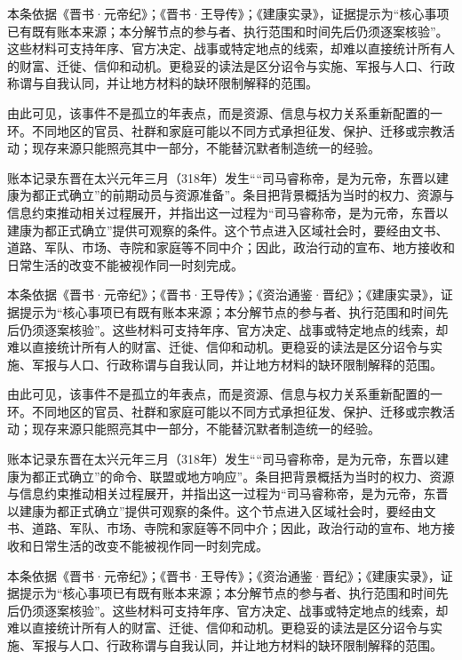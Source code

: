 本条依据《晋书·元帝纪》；《晋书·王导传》；《建康实录》，证据提示为“核心事项已有既有账本来源；本分解节点的参与者、执行范围和时间先后仍须逐案核验”。这些材料可支持年序、官方决定、战事或特定地点的线索，却难以直接统计所有人的财富、迁徙、信仰和动机。更稳妥的读法是区分诏令与实施、军报与人口、行政称谓与自我认同，并让地方材料的缺环限制解释的范围。

由此可见，该事件不是孤立的年表点，而是资源、信息与权力关系重新配置的一环。不同地区的官员、社群和家庭可能以不同方式承担征发、保护、迁移或宗教活动；现存来源只能照亮其中一部分，不能替沉默者制造统一的经验。

账本记录东晋在太兴元年三月（318年）发生““司马睿称帝，是为元帝，东晋以建康为都正式确立”的前期动员与资源准备”。条目把背景概括为当时的权力、资源与信息约束推动相关过程展开，并指出这一过程为“司马睿称帝，是为元帝，东晋以建康为都正式确立”提供可观察的条件。这个节点进入区域社会时，要经由文书、道路、军队、市场、寺院和家庭等不同中介；因此，政治行动的宣布、地方接收和日常生活的改变不能被视作同一时刻完成。

本条依据《晋书·元帝纪》；《晋书·王导传》；《资治通鉴·晋纪》；《建康实录》，证据提示为“核心事项已有既有账本来源；本分解节点的参与者、执行范围和时间先后仍须逐案核验”。这些材料可支持年序、官方决定、战事或特定地点的线索，却难以直接统计所有人的财富、迁徙、信仰和动机。更稳妥的读法是区分诏令与实施、军报与人口、行政称谓与自我认同，并让地方材料的缺环限制解释的范围。

由此可见，该事件不是孤立的年表点，而是资源、信息与权力关系重新配置的一环。不同地区的官员、社群和家庭可能以不同方式承担征发、保护、迁移或宗教活动；现存来源只能照亮其中一部分，不能替沉默者制造统一的经验。

账本记录东晋在太兴元年三月（318年）发生““司马睿称帝，是为元帝，东晋以建康为都正式确立”的命令、联盟或地方响应”。条目把背景概括为当时的权力、资源与信息约束推动相关过程展开，并指出这一过程为“司马睿称帝，是为元帝，东晋以建康为都正式确立”提供可观察的条件。这个节点进入区域社会时，要经由文书、道路、军队、市场、寺院和家庭等不同中介；因此，政治行动的宣布、地方接收和日常生活的改变不能被视作同一时刻完成。

本条依据《晋书·元帝纪》；《晋书·王导传》；《资治通鉴·晋纪》；《建康实录》，证据提示为“核心事项已有既有账本来源；本分解节点的参与者、执行范围和时间先后仍须逐案核验”。这些材料可支持年序、官方决定、战事或特定地点的线索，却难以直接统计所有人的财富、迁徙、信仰和动机。更稳妥的读法是区分诏令与实施、军报与人口、行政称谓与自我认同，并让地方材料的缺环限制解释的范围。


